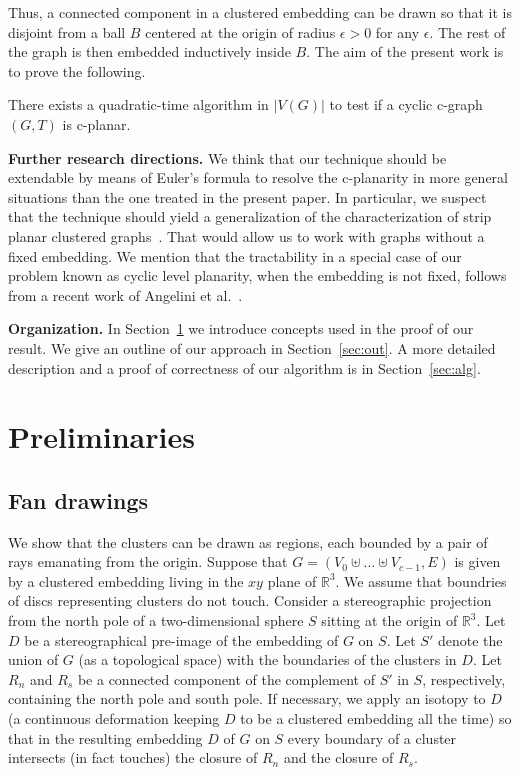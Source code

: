 \documentclass{llncs}
\newif\iflong
\begin{document}
Thus, a connected component in a clustered embedding 
can be drawn so that it is disjoint from a ball $B$ centered at the origin of radius $\epsilon>0$
for any $\epsilon$. The rest of the graph is then embedded inductively inside $B$.
The aim of the present work is to prove the following.

\begin{theorem}
There exists a quadratic-time algorithm in $|V(G)|$ to test if a cyclic c-graph $(G,T)$ is c-planar.
\end{theorem}




{\bf Further research directions.}
We think that our technique should be extendable by means of Euler's formula to resolve the c-planarity in more general situations than the one treated in the present paper. In particular, we suspect that
the technique should yield a generalization of the characterization of strip planar clustered graphs~\cite[Section 5]{F14+}. 
That would allow us to work with graphs without a fixed embedding. We mention that the tractability in a special case 
of our problem known as cyclic level planarity, when the embedding is not fixed, follows from a recent work of Angelini et al.~\cite{angelini2015beyond}.


{\bf Organization.} In Section~\ref{sec:pre} we introduce concepts used in the proof of
our result. We give an outline of our approach in Section~\ref{sec:out}.
A more detailed description and a proof of correctness of our algorithm is in Section~\ref{sec:alg}.



 
\section{Preliminaries}
\label{sec:pre}

\iflong
\subsection{Fan drawings}
\label{sec:fan}
We show that the clusters can be drawn as regions, each bounded by a pair of rays emanating from the origin.
Suppose that $G=(V_0\uplus \ldots \uplus V_{c-1},E) $ is given by a clustered embedding
living in the $xy$ plane of $\mathbb{R}^3$.
We assume that boundries of discs representing clusters do not touch.
Consider a stereographic projection from the north pole of a two-dimensional sphere $S$ 
sitting at the origin of $\mathbb{R}^3$.
Let $D$ be a stereographical pre-image of the embedding of $G$ on $S$.
Let $S'$ denote the union of $G$ (as a topological space) with the boundaries of the clusters in $D$.
Let $R_n$ and $R_s$ be a connected component of the complement of $S'$ in $S$, respectively, containing the north pole and south pole.
If necessary, we apply an isotopy  to $D$ (a continuous deformation keeping $D$ to be a clustered embedding all the time)  so that in the resulting embedding $D$ of $G$ on $S$ every boundary of a cluster intersects (in fact touches) the closure of $R_n$ and  the closure of $R_s$. 
\end{document}
